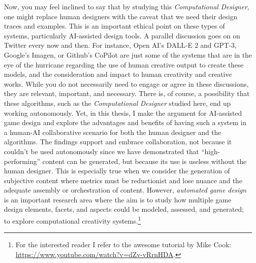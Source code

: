 Now, you may feel inclined to say that by studying this \emph{Computational Designer}, one might replace human designers with the caveat that we need their design traces and examples. This is an important ethical point on these types of systems, particularly AI-assisted design tools. A parallel discussion goes on on Twitter every now and then. For instance, Open AI's DALL-E 2 and GPT-3, Google's Imagen, or Github's CoPilot are just some of the systems that are in the eye of the hurricane regarding the use of human creative output to create these models, and the consideration and impact to human creativity and creative works. While you do not necessarily need to engage or agree in these discussions, they are relevant, important, and necessary. There is, of course, a possibility that these algorithms, such as the \emph{Computational Designer} studied here, end up working autonomously. Yet, in this thesis, I make the argument for AI-assisted game design and explore the advantages and benefits of having such a system in a human-AI collaborative scenario for both the human designer and the algorithms. The findings support and embrace collaboration, not because it couldn't be used autonomously since we have demonstrated that ``high-performing'' content can be generated, but because its use is useless without the human designer. This is especially true when we consider the generation of subjective content where metrics must be reductionist and lose nuance and the adequate assembly or orchestration of content. However, \emph{automated game design} is an important research area where the aim is to study how multiple game design elements, facets, and aspects could be modeled, assessed, and generated; to explore computational creativity systems.\footnote{For the interested reader I refer to the awesome tutorial by Mike Cook: \url{https://www.youtube.com/watch?v=dZv-vRrnHDA}.}







